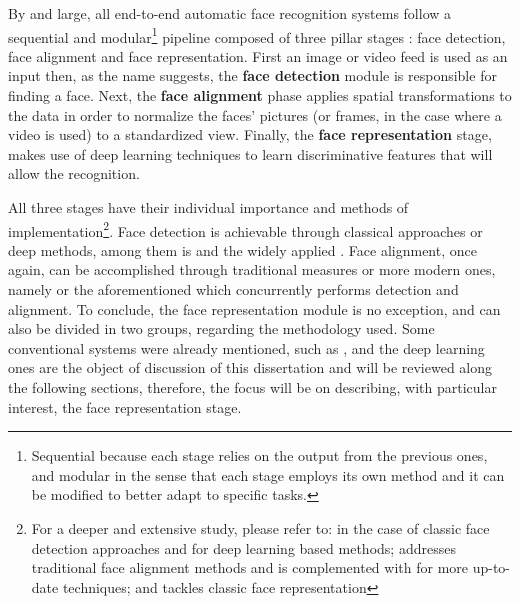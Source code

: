 \documentclass[class=report, crop=false, a4paper, 12pt]{standalone}
\begin{document}
\par By and large, all end-to-end automatic face recognition systems follow a sequential and modular\footnote{Sequential because each stage relies on the output from the previous ones, and modular in the sense that each stage employs its own method and it can be modified to better adapt to specific tasks.} pipeline  composed of three pillar stages \autocite{wangDeepFaceRecognition2021}: face detection, face alignment and face representation. First an image or video feed is used as an input then, as the name suggests, the \textbf{face detection} module is responsible for finding a face. Next, the \textbf{face alignment} phase applies spatial transformations to the data in order to normalize the faces' pictures (or frames, in the case where a video is used) to a standardized view. Finally, the \textbf{face representation} stage, makes use of deep learning techniques to learn discriminative features that will allow the recognition.

\par All three stages have their individual importance and methods of implementation\footnote{For a deeper and extensive study, please refer to: \autocite{zafeiriouSurveyFaceDetection2015} in the case of classic face detection approaches and \autocite{minaeeGoingDeeperFace2021} for deep learning based methods; \autocite{wangFacialFeaturePoint2018} addresses traditional face alignment methods and is complemented with \autocite{duElementsEndtoendDeep2022} for more up-to-date techniques; and \autocite{learned-millerLabeledFacesWild2016} tackles classic face representation }. Face detection is achievable through classical approaches \autocite{violaRapidObjectDetection2001, brubakerDesignCascadesBoosted2008} or deep methods, among them is \autocite{dengRetinaFaceSinglestageDense2019} and the widely applied \autocite{zhangJointFaceDetection2016a}. Face alignment, once again, can be accomplished through traditional measures \autocite{cootesViewbasedActiveAppearance2002, martinezLocalEvidenceAggregation2013} or more modern ones, namely \autocite{huangPropagationNetPropagatePoints2020} or the aforementioned \autocite{zhangJointFaceDetection2016a} which concurrently performs detection and alignment. To conclude, the face representation module is no exception, and can also be divided in two groups, regarding the methodology used. Some conventional systems were already mentioned, such as \autocite{p.n.belhumeurEigenfacesVsFisherfaces1997,turkEigenfacesRecognition1991}, and the deep learning ones are the object of discussion of this dissertation and will be reviewed along the following sections, therefore, the focus will be on describing, with particular interest, the face representation stage.
\end{document}
